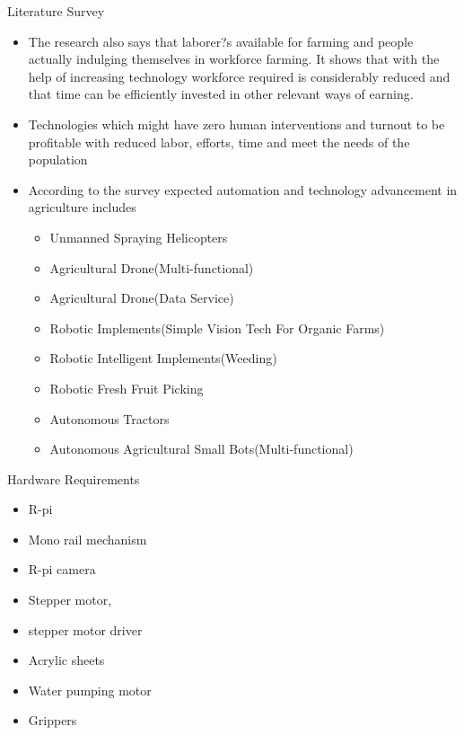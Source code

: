 \documentclass[10pt]{beamer}
\begin{document}
\begin{frame}[t]{ Literature Survey
		}\label{s2}
\begin{itemize}
\item The research also says that  laborer?s available for farming and people actually indulging themselves in workforce farming. It shows that with the help of increasing technology workforce required is considerably reduced and that time can be efficiently invested in other relevant ways of earning. 

\item Technologies which might have zero human interventions and turnout to be profitable with reduced labor, efforts, time and meet the needs of the population
\item According to the survey expected automation and technology advancement in agriculture includes 


\begin{itemize}
\item Unmanned Spraying Helicopters
\item Agricultural Drone(Multi-functional)
\item Agricultural Drone(Data Service)
\item Robotic Implements(Simple Vision Tech For Organic Farms)
\item Robotic Intelligent Implements(Weeding)
\item Robotic Fresh Fruit Picking
\item Autonomous Tractors
\item Autonomous Agricultural Small Bots(Multi-functional)

\end{itemize}


\end{itemize}

\end{frame}


\begin{frame}[t]{Hardware Requirements
		}\label{s2}
\begin{itemize}



\item  R-pi
\item   Mono rail mechanism
\item    R-pi camera
 \item   Stepper motor,
\item         stepper motor driver
\item  Acrylic sheets
\item       Water pumping motor
\item       Grippers
 




\end{itemize}
\end{frame}
\end{document}
